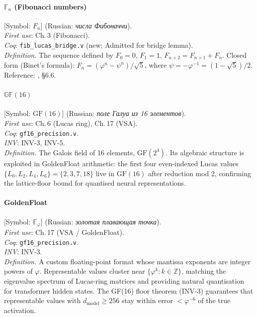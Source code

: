 \paragraph*{\textmd{\textbf{$\mathbb{F}_n$ (Fibonacci numbers)}}}
\label{entry:fibonacci}
[Symbol: $F_n$] (Russian: \textit{числа Фибоначчи}).\\
\textit{First use}: Ch.\,3 (Fibonacci).\\
\textit{Coq}: \texttt{fib\_lucas\_bridge.v} (new; Admitted for bridge lemma).\\
\textit{Definition.}
The sequence defined by $F_0=0$, $F_1=1$,
$F_{n+2} = F_{n+1}+F_n$.
Closed form (Binet's formula):
$F_n = (\varphi^n - \psi^n)/\sqrt{5}$,
where $\psi = -\varphi^{-1} = (1-\sqrt{5})/2$.
Reference: \cite{knuth_concrete_math}, §6.6.

\paragraph*{\textmd{\textbf{$\mathbb{GF}(16)$}}}
\label{entry:gf16}
[Symbol: $\mathrm{GF}(16)$] (Russian: \textit{поле Галуа из 16 элементов}).\\
\textit{First use}: Ch.\,6 (Lucas ring), Ch.\,17 (VSA).\\
\textit{Coq}: \texttt{gf16\_precision.v}.\\
\textit{INV}: INV-3, INV-5.\\
\textit{Definition.}
The Galois field of 16 elements, $\mathrm{GF}(2^4)$.
Its algebraic structure is exploited in GoldenFloat arithmetic:
the first four even-indexed Lucas values
$\{L_0,L_2,L_4,L_6\}=\{2,3,7,18\}$ live in $\mathrm{GF}(16)$ after
reduction mod 2, confirming the lattice-floor bound for quantised
neural representations.

\paragraph*{\textmd{\textbf{GoldenFloat}}}
\label{entry:goldenfloat}
[Symbol: $\mathbb{F}_\varphi$] (Russian: \textit{золотая плавающая точка}).\\
\textit{First use}: Ch.\,17 (VSA / GoldenFloat).\\
\textit{Coq}: \texttt{gf16\_precision.v}.\\
\textit{INV}: INV-3.\\
\textit{Definition.}
A custom floating-point format whose mantissa exponents are
integer powers of $\varphi$.
Representable values cluster near $\{\varphi^k : k \in \mathbb{Z}\}$,
matching the eigenvalue spectrum of Lucas-ring matrices and providing
natural quantisation for transformer hidden states.
The GF(16) floor theorem (INV-3) guarantees that representable values
with $d_{\mathrm{model}}\ge 256$ stay within error $< \varphi^{-6}$ of
the true activation.

